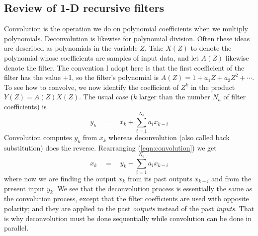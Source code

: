 \subsection{Review of 1-D recursive filters}
Convolution is the operation we do on polynomial coefficients
when we multiply polynomials.
Deconvolution is likewise for polynomial division.
Often these ideas are described
as polynomials in the variable $Z$.
Take $X(Z)$ to denote the polynomial
whose coefficients are samples of input data,
and let $A(Z)$ likewise denote the filter.
The convention I adopt here is that the first coefficient
of the filter has the value +1, so the filter's polynomial
is $A(Z) = 1 + a_1Z + a_2Z^2 + \cdots$.
To see how to convolve, we now identify the coefficient
of $Z^k$ in the product $Y(Z)=A(Z)X(Z)$.
The usual case ($k$ larger than the number $N_a$ of filter coefficients) is
\begin{equation}
y_k \quad=\quad x_k + \sum_{i=1}^{N_a} a_i x_{k-i}
\label{eqn:convolution}
\end{equation}
Convolution computes $y_k$ from $x_k$ whereas deconvolution
(also called back substitution) does the reverse.
Rearranging (\ref{eqn:convolution}) we get
\begin{equation}
x_k \quad=\quad y_k - \sum_{i=1}^{N_a} a_i x_{k-i}
\label{eqn:deconvolution}
\end{equation}
where now we are finding the output $x_k$ from
its past outputs $x_{k-i}$ and from the present input $y_k$.
We see that the deconvolution process is essentially
the same as the convolution process,
except that the filter coefficients
are used with opposite polarity;
and they are applied to the past {\em  outputs}
instead of the past {\em  inputs}.
That is why deconvolution must be done sequentially
while convolution can be done in parallel.



